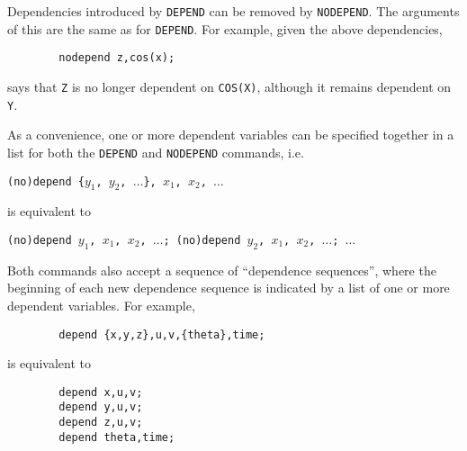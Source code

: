 Dependencies introduced by \texttt{DEPEND} can be removed by \texttt{NODEPEND}.
 The arguments of this are the same as for \texttt{DEPEND}.
For example, given the above dependencies,
\begin{verbatim}
        nodepend z,cos(x);
\end{verbatim}
says that \texttt{Z} is no longer dependent on \texttt{COS(X)}, although it remains
dependent on \texttt{Y}.

As a convenience, one or more dependent variables can be specified
together in a list for both the \texttt{DEPEND} and \texttt{NODEPEND}
commands, i.e.

\texttt{(no)depend \{$y_1$, $y_2$, $\ldots$\}, $x_1$, $x_2$, $\ldots$}

is equivalent to

\texttt{(no)depend $y_1$, $x_1$, $x_2$, $\ldots$; (no)depend $y_2$, $x_1$, $x_2$, $\ldots$; $\ldots$}

Both commands also accept a sequence of ``dependence sequences'',
where the beginning of each new dependence sequence is indicated by a
list of one or more dependent variables.  For example,
\begin{verbatim}
        depend {x,y,z},u,v,{theta},time;
\end{verbatim}
is equivalent to
\begin{verbatim}
        depend x,u,v;
        depend y,u,v;
        depend z,u,v;
        depend theta,time;
\end{verbatim}
